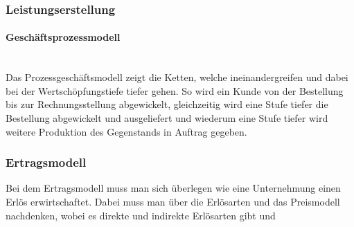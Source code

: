 \documentclass{article}
\newcommand{\paragraphlb}[1]{\paragraph{#1}\mbox{}\\}
\begin{document}
		\subsubsection{Leistungserstellung}
		\paragraphlb{Geschäftsprozessmodell}
		Das Prozessgeschäftsmodell zeigt die Ketten, welche ineinandergreifen und dabei bei der Wertschöpfungstiefe tiefer gehen. So wird ein Kunde von der Bestellung bis zur Rechnungsstellung abgewickelt, gleichzeitig wird eine Stufe tiefer die Bestellung abgewickelt und ausgeliefert und wiederum eine Stufe tiefer wird weitere Produktion des Gegenstands in Auftrag gegeben.
		\subsubsection{Ertragsmodell}
		Bei dem Ertragsmodell muss man sich überlegen wie eine Unternehmung einen Erlös erwirtschaftet. Dabei muss man über die Erlösarten und das Preismodell nachdenken, wobei es direkte und indirekte Erlösarten gibt und 	























  
\end{document}
